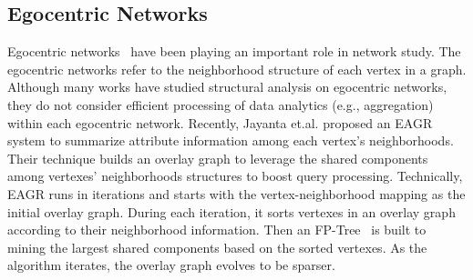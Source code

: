 \subsection{Egocentric Networks}
Egocentric networks~\cite{ma2010ego,marsden2002egocentric} 
have been playing an important role in network study. The egocentric networks
refer to the neighborhood structure of each vertex
in a graph. Although many works have studied structural analysis on egocentric networks, they do not consider efficient processing 
of data analytics (e.g., aggregation) within each egocentric network. 
Recently, Jayanta et.al. \cite{mondal2014eagr} 
proposed an EAGR system to summarize attribute information among 
each vertex's neighborhoods. Their technique builds an overlay graph 
to leverage the shared components among vertexes' neighborhoods structures to
boost query processing.
%
Technically, EAGR runs in iterations and starts with the vertex-neighborhood mapping
as the initial overlay graph. During each iteration,
it sorts vertexes in an overlay graph according to their neighborhood information. 
Then an FP-Tree~\cite{han2000mining} is built to mining the largest shared components based
on the sorted vertexes.
As the algorithm iterates, the overlay graph evolves to be sparser. 

%
%

